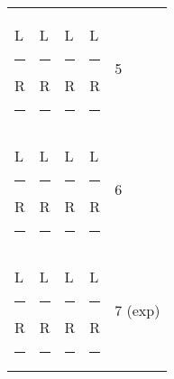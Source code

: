 \documentclass{article}
\begin{document}
\begin{minipage}[t]{0.52\textwidth}
{\begin{tabularx}{\linewidth}{XXXXX}
    L\rule{1.4em}{0.4pt} R\rule{1.4em}{0.4pt} & L\rule{1.4em}{0.4pt} R\rule{1.4em}{0.4pt} &
      L\rule{1.4em}{0.4pt} R\rule{1.4em}{0.4pt} & L\rule{1.4em}{0.4pt} R\rule{1.4em}{0.4pt} & 5 \\
    L\rule{1.4em}{0.4pt} R\rule{1.4em}{0.4pt} & L\rule{1.4em}{0.4pt} R\rule{1.4em}{0.4pt} &
      L\rule{1.4em}{0.4pt} R\rule{1.4em}{0.4pt} & L\rule{1.4em}{0.4pt} R\rule{1.4em}{0.4pt} & 6 \\
    L\rule{1.4em}{0.4pt} R\rule{1.4em}{0.4pt} & L\rule{1.4em}{0.4pt} R\rule{1.4em}{0.4pt} &
      L\rule{1.4em}{0.4pt} R\rule{1.4em}{0.4pt} & L\rule{1.4em}{0.4pt} R\rule{1.4em}{0.4pt} & 7 (exp) \\
  \end{tabularx}}
\end{minipage}
\end{document}

